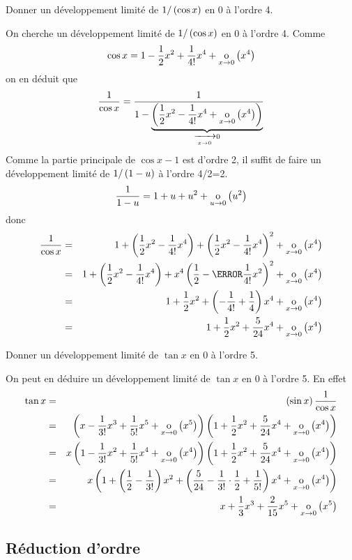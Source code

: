 \documentclass{magnoliaold}
\begin{document}
\begin{exos}
\exo Donner un développement limité de $1/\left(\cos x\right)$ en 0 à l'ordre 4.
  \begin{sol}
  On cherche un développement limité de $1/\left(\cos x\right)$ en 0 à l'ordre 4.
  Comme
  \[\cos x=1-\frac{1}{2}x^2+\frac{1}{4!}x^4+\underset{x \rightarrow 0}{\text{o}}\left(x^4\right)\]
  on en déduit que
  \[\frac{1}{\cos x}
    =\frac{1}{1-\underbrace{\p{\frac{1}{2}x^2-\frac{1}{4!}x^4+%
      \petitozero{x}{x^4}}}_{\tendvers{x}{0}0}}\]
  Comme la partie principale de $\cos x-1$ est d'ordre 2, il suffit de faire un
  développement limité de $1/\left(1-u\right)$ à l'ordre 4/2=2.
  \[\frac{1}{1-u}=1+u+u^2+\underset{u \rightarrow 0}{\text{o}}\left(u^2\right)\]
  donc
  \begin{eqnarray*}
  \frac{1}{\cos x}
  &=& 1+\p{\frac{1}{2}x^2-\frac{1}{4!}x^4}+\p{\frac{1}{2}x^2-\frac{1}{4!}x^4}^2
      +\petitozero{x}{x^4}\\
  &=& 1+\p{\frac{1}{2}x^2-\frac{1}{4!}x^4}+x^4\p{\frac{1}{2}-%
      \cancel{\frac{1}{4!}x^2}}^2
      +\petitozero{x}{x^4}\\
  &=& 1+\frac{1}{2}x^2+\p{-\frac{1}{4!}+\frac{1}{4}}x^4+\petitozero{x}{x^4}\\
  &=& 1+\frac{1}{2}x^2+\frac{5}{24}x^4+\petitozero{x}{x^4}
  \end{eqnarray*}    
  \end{sol}
\exo Donner un développement limité de $\tan x$ en 0
  à l'ordre 5.
  \begin{sol}
  On peut en déduire un développement limité de $\tan x$ en 0
  à l'ordre 5. En effet
  \begin{eqnarray*}
  \tan x
  &=& \left(\sin x\right)\frac{1}{\cos x}\\
  &=& \left(x-\frac{1}{3!}x^3+\frac{1}{5!}x^5+\underset{x \rightarrow 0}{\text{o}}\left(x^5\right)\right)
      \left(1+\frac{1}{2}x^2+\frac{5}{24}x^4+\underset{x \rightarrow 0}{\text{o}}\left(x^4\right)\right)\\
  &=& x \left(1-\frac{1}{3!}x^2+\frac{1}{5!}x^4+\underset{x \rightarrow 0}{\text{o}}\left(x^4\right)\right)
      \left(1+\frac{1}{2}x^2+\frac{5}{24}x^4+\underset{x \rightarrow 0}{\text{o}}\left(x^4\right)\right)\\
  &=& x\left(1+\left(\frac{1}{2}-\frac{1}{3!}\right)x^2+
      \left(\frac{5}{24}-\frac{1}{3!}\cdot\frac{1}{2}+\frac{1}{5!}\right)x^4
      +\underset{x \rightarrow 0}{\text{o}}\left(x^4\right)\right)\\
  &=& x+\frac{1}{3}x^3+\frac{2}{15}x^5+\underset{x \rightarrow 0}{\text{o}}\left(x^5\right)
  \end{eqnarray*}    
  \end{sol}
\end{exos}



\subsection{Réduction d'ordre}
\end{document}
